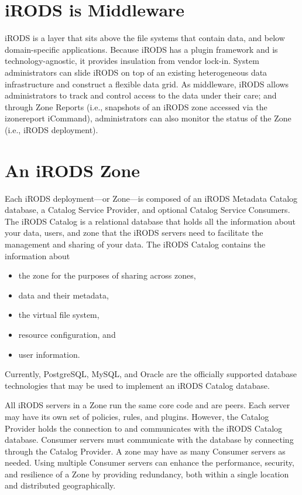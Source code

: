 \documentclass[10pt,oneside]{memoir}
\begin{document}
\section{iRODS is Middleware}

iRODS is a layer that sits above the file systems that contain data, and below domain-specific applications. Because iRODS has a plugin framework and is technology-agnostic, it provides insulation from vendor lock-in. System administrators can slide iRODS on top of an existing heterogeneous data infrastructure and construct a flexible data grid. As middleware, iRODS allows administrators to track and control access to the data under their care; and through Zone Reports (i.e., snapshots of an iRODS zone accessed via the izonereport iCommand), administrators can also monitor the status of the Zone (i.e., iRODS deployment).


\section{An iRODS Zone}

Each iRODS deployment---or Zone---is composed of an iRODS Metadata Catalog database, a Catalog Service Provider, and optional Catalog Service Consumers. The iRODS Catalog is a relational database that holds all the information about your data, users, and zone that the iRODS servers need to facilitate the management and sharing of your data. The iRODS Catalog contains the information about
 \begin{itemize}
 \item the zone for the purposes of sharing across zones,
 \item data and their metadata,
 \item the virtual file system,
 \item resource configuration, and
 \item user information.
 \end{itemize}

Currently, PostgreSQL, MySQL, and Oracle are the officially supported database technologies that may be used to implement an iRODS Catalog database.

All iRODS servers in a Zone run the same core code and are peers. Each server may have its own set of policies, rules, and plugins. However, the Catalog Provider holds the connection to and communicates with the iRODS Catalog database. Consumer servers must communicate with the database by connecting through the Catalog Provider. A zone may have as many Consumer servers as needed. Using multiple Consumer servers can enhance the performance, security, and resilience of a Zone by providing redundancy, both within a single location and distributed geographically.
\end{document}
